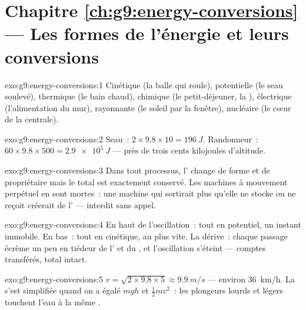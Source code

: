 \section*{Chapitre \ref{ch:g9:energy-conversions} --- Les formes de l'énergie et leurs conversions}

\begin{solution}{exo:g9:energy-conversions:1}
Cinétique (la balle qui roule), potentielle (le seau soulevé),
thermique (le bain chaud), chimique (le petit-déjeuner, la ),
électrique (l'alimentation du mur), rayonnante (le soleil par la
fenêtre), nucléaire (le cœur de la centrale).
\end{solution}

\begin{solution}{exo:g9:energy-conversions:2}
Seau~: $2 \times 9.8 \times 10 = \qty{196}{J}$. Randonneur~:
$60 \times 9.8 \times 500 = \qty{2.9e5}{J}$ --- près de trois cents
kilojoules d'altitude.
\end{solution}

\begin{solution}{exo:g9:energy-conversions:3}
Dans tout processus, l' change de forme et de propriétaire mais
le total est exactement conservé. Les machines à mouvement perpétuel
en sont mortes~: une machine qui sortirait plus qu'elle ne stocke ou
ne reçoit créerait de l' --- interdit sans appel.
\end{solution}

\begin{solution}{exo:g9:energy-conversions:4}
En haut de l'oscillation~: tout en potentiel, un instant immobile. En
bas~: tout en cinétique, au plus vite. La dérive~: chaque passage
écrème un peu en tiédeur de l' et du , et l'oscillation
s'éteint --- comptes transférés, total intact.
\end{solution}

\begin{solution}{exo:g9:energy-conversions:5}
$v = \sqrt{2 \times 9.8 \times 5} \approx \qty{9.9}{m/s}$ --- environ
\qty{36}{km/h}. La  s'est simplifiée quand on a égalé $m g h$ et
$\frac12 m v^2$~: les plongeurs lourds et légers touchent l'eau à la
même .
\end{solution}

